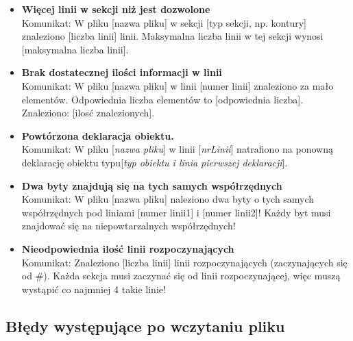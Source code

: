 \documentclass[a4paper, 10pt, titlepage]{article}
\begin{document}
\begin{itemize}
\item \textbf{Więcej linii w sekcji niż jest dozwolone}
\\Komunikat: W pliku [nazwa pliku] w sekcji [typ sekcji, np. kontury] znaleziono [liczba linii] linii. Maksymalna liczba linii w tej sekcji wynosi [maksymalna liczba linii].

\item \textbf{Brak dostatecznej ilości informacji w linii}
\\Komunikat: W pliku [nazwa pliku] w linii [numer linii] znaleziono za mało elementów. Odpowiednia liczba elementów to [odpowiednia liczba]. Znaleziono: [ilosć znalezionych].

\item \textbf{Powtórzona deklaracja obiektu.}
\\Komunikat: W pliku [\textit{nazwa pliku}] w linii [\textit{nrLinii}] natrafiono na ponowną deklarację obiektu typu[\textit{typ obiektu i linia pierwszej deklaracji}].

\item \textbf{Dwa byty znajdują się na tych samych współrzędnych}
\\Komunikat: W pliku [nazwa pliku] naleziono dwa byty o tych samych współrzędnych pod liniami [numer linii1] i [numer linii2]! Każdy byt musi znajdować się na niepowtarzalnych współrzędnych!

\item \textbf{Nieodpowiednia ilość linii rozpoczynających}
\\Komunikat: Znaleziono [liczba linii] linii rozpoczynających (zaczynających się od \#). Każda sekcja musi zaczynać się od linii rozpoczynającej, więc muszą wystąpić co najmniej 4 takie linie!

\end{itemize}

\subsection{Błędy występujące po wczytaniu pliku}
\end{document}
